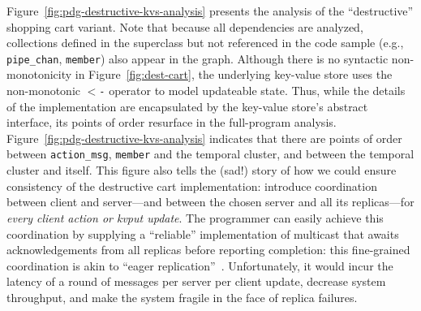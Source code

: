 Figure~\ref{fig:pdg-destructive-kvs-analysis} presents the analysis of the 
``destructive'' shopping cart variant.  Note that
because all dependencies are analyzed, collections defined in the superclass
but not referenced in the code sample
(e.g., \texttt{pipe\_chan}, \texttt{member}) also appear in the graph.
Although there is no syntactic
non-monotonicity in 
Figure~\ref{fig:dest-cart}, the underlying key-value store
uses the non-monotonic \texttt{$<$-} operator to model updateable state.
Thus, while the details of the implementation are encapsulated by the key-value
store's abstract interface, its points of order resurface in the full-program analysis.
Figure~\ref{fig:pdg-destructive-kvs-analysis}
indicates that there are
points of order between \texttt{action\_msg}, \texttt{member} and the temporal cluster,
and between the temporal cluster and itself.
This figure also tells the (sad!) story of how we could ensure consistency of the destructive cart implementation: introduce coordination
between client and server---and between the chosen server and all its replicas---for {\em every client action or kvput update}.  
The programmer can easily achieve this coordination by supplying a ``reliable'' implementation
of multicast that awaits acknowledgements from all replicas before reporting completion: this fine-grained coordination is akin to ``eager replication''~\cite{dangers}.  Unfortunately, it would incur the latency of a round of messages per server per client update, decrease system throughput, and make the system fragile in the face of replica failures.

